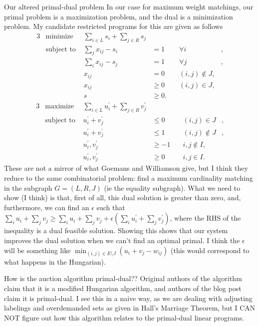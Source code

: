 \documentclass[11pt]{article}
\renewcommand{\'}{^{'}}
\begin{document}
\begin{section}{Our altered primal-dual problem}
	In our case for maximum weight matchings, our primal problem is a maximization problem, and 
	the dual is a minimization problem. My candidate restricted programs for this are given 
	as follows
	\begin{alignat}{3}
		& \text{minimize } & \sum_{i\in L} s_i + \sum_{j\in R} s_j & \\
		& \text{subject to } & \sum_j x_{ij} - s_i & = 1 & \quad \forall i &, \\
				     && \sum_i x_{ij} - s_j & = 1 & \quad \forall j &, \\
				     && x_{ij} & = 0 & \quad (i,j)\notin J, \\
				     && x_{ij} & \geq 0 & \quad (i,j)\in J, \\
				     && s & \geq 0.
	\end{alignat}
	\begin{alignat}{3}
		& \text{maximize } & \sum_{i\in L} u_{i}^{'} + \sum_{j\in R} v_{j}^{'} & \\
		& \text{subject to } & u_i^{'} + v_j^{'} & \leq 0 & \quad (i,j)\in J &, \\
				     && u_i^{'} + v_j^{'} & \leq 1 & \quad (i,j)\notin J &, \\
				     && u_i^{'},v_j^{'} &\geq -1 & \quad i,j\notin I, \\ 
				     && u_{i}^{'},v_j^{'} &\geq 0 & \quad i,j\in I.
	\end{alignat}
	These are not a mirror of what Goemans and Williamson give, but I think they reduce to the 
	same combinatorial problem: find a maximum cardinality matching in the subgraph $G = (L,R,J)$ 
	(ie the equality subgraph). What we need to show (I think) is that, first of all, this dual 
	solution is greater than zero, and, furthermore, we can find an $\epsilon$ such that 
	$\sum_i u_i + \sum_j v_j \geq \sum_i u_i + \sum_j v_j + \epsilon (\sum_i u_i^{'} + \sum_j 
	v_j^{'})$, where the RHS of the inequality is a dual feasible solution. Showing this shows that 
	our system improves the dual solution when we can't find an optimal primal. I think the 
	$\epsilon$ will be something like $\min_{(i,j)\in E\setminus J} (u_i + v_j - w_{ij})$ (this 
	would correspond to what happens in the Hungarian).
\end{section}
\begin{section}{How is the auction algorithm primal-dual??}
	Original authors of the algorithm claim that it is a modified Hungarian algorithm, and authors 
	of the blog post claim it is primal-dual. I see this in a naive way, as we are dealing with 
	adjusting labelings and overdemanded sets as given in Hall's Marriage Theorem, but I CAN NOT 
	figure out how this algorithm relates to the primal-dual linear programs.
\end{section}
\end{document}
